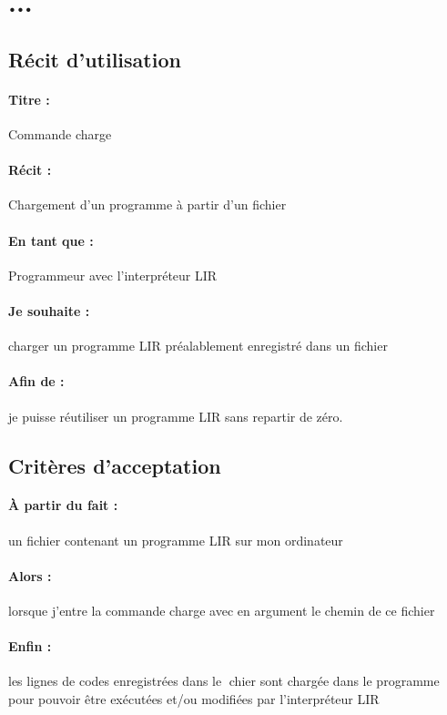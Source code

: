 \section{...} %

\subsection*{Récit d'utilisation}

\paragraph{Titre : } Commande charge
\paragraph{Récit : } Chargement d'un programme à partir d'un fichier
\paragraph{En tant que : } Programmeur avec l'interpréteur LIR
\paragraph{Je souhaite : }  charger un programme LIR préalablement enregistré dans un fichier
\paragraph{Afin de : } je puisse réutiliser un programme LIR sans repartir de zéro.

\subsection*{Critères d'acceptation}

\paragraph{À partir du fait : } un fichier contenant un programme LIR sur mon ordinateur
\paragraph{Alors : } lorsque j'entre la commande charge avec en argument le chemin de ce fichier
\paragraph{Enfin : } les lignes de codes enregistrées dans le chier sont chargée dans le
                     programme pour pouvoir être exécutées et/ou modifiées par l'interpréteur LIR

